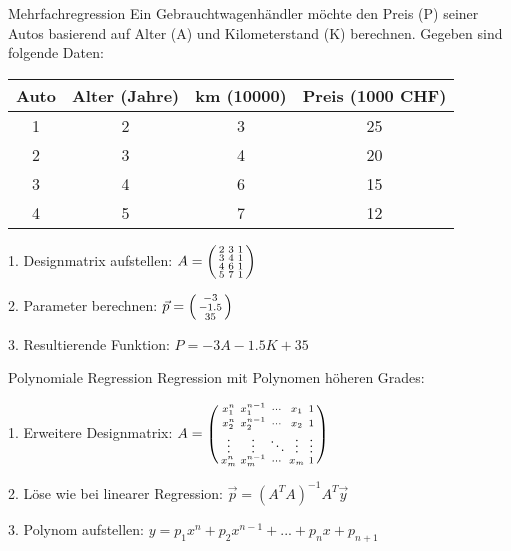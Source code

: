 \begin{example2}{Mehrfachregression}
Ein Gebrauchtwagenhändler möchte den Preis (P) seiner Autos basierend auf Alter (A) und Kilometerstand (K) berechnen.
Gegeben sind folgende Daten:

\begin{center}
\begin{tabular}{|c|c|c|c|}
\hline
Auto & Alter (Jahre) & km (10000) & Preis (1000 CHF) \\
\hline
1 & 2 & 3 & 25 \\
2 & 3 & 4 & 20 \\
3 & 4 & 6 & 15 \\
4 & 5 & 7 & 12 \\
\hline
\end{tabular}
\end{center}

1. Designmatrix aufstellen:
   $A = \begin{psmallmatrix}
   2 & 3 & 1 \\
   3 & 4 & 1 \\
   4 & 6 & 1 \\
   5 & 7 & 1
   \end{psmallmatrix}$

2. Parameter berechnen:
   $\vec{p} = \begin{psmallmatrix} -3 \\ -1.5 \\ 35 \end{psmallmatrix}$

3. Resultierende Funktion:
   $P = -3A - 1.5K + 35$
\end{example2}

\begin{KR}{Polynomiale Regression}
Regression mit Polynomen höheren Grades:

1. Erweitere Designmatrix:
   $A = \begin{psmallmatrix}
   x_1^n & x_1^{n-1} & \cdots & x_1 & 1 \\
   x_2^n & x_2^{n-1} & \cdots & x_2 & 1 \\
   \vdots & \vdots & \ddots & \vdots & \vdots \\
   x_m^n & x_m^{n-1} & \cdots & x_m & 1
   \end{psmallmatrix}$

2. Löse wie bei linearer Regression:
   $\vec{p} = (A^T A)^{-1} A^T \vec{y}$

3. Polynom aufstellen:
   $y = p_1x^n + p_2x^{n-1} + ... + p_nx + p_{n+1}$
\end{KR}

